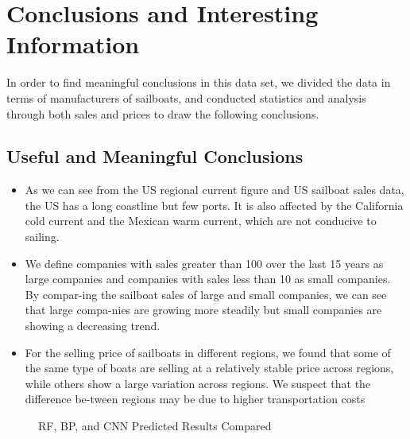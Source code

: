 \section{Conclusions and Interesting Information}
In order to find meaningful conclusions in this data set, we divided the data in terms of manufacturers of sailboats, and conducted statistics and analysis through both sales and prices to draw the following conclusions.
\subsection{Useful and Meaningful Conclusions}
\begin{itemize}
    \setlength{\parsep}{0ex} %
    \setlength{\topsep}{2ex} %
    \setlength{\itemsep}{1ex} %
    \item As we can see from the US regional current figure and US sailboat sales data, the US has a long coastline but few ports. It is also affected by the California cold current and the Mexican warm current, which are not conducive to sailing.
    \item We define companies with sales greater than 100 over the last 15 years as large companies and companies with sales less than 10 as small companies. By compar-ing the sailboat sales of large and small companies, we can see that large compa-nies are growing more steadily but small companies are showing a decreasing trend.
    \item For the selling price of sailboats in different regions, we found that some of the same type of boats are selling at a relatively stable price across regions, while others show a large variation across regions. We suspect that the difference be-tween regions may be due to higher transportation costs
\end{itemize}

\begin{figure}[H]
    \centering    
	\caption{RF, BP, and CNN Predicted Results Compared} %
    \vspace{-0.5cm}
\end{figure}

